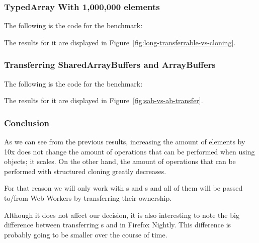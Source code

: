 \subsubsection{TypedArray With 1,000,000 elements}
The following is the code for the benchmark:

The results for it are displayed in Figure~\ref{fig:long-transferrable-vs-cloning}.

\subsubsection{Transferring SharedArrayBuffers and ArrayBuffers}
The following is the code for the benchmark:

The results for it are displayed in Figure~\ref{fig:sab-vs-ab-transfer}.

\subsubsection{Conclusion}
As we can see from the previous results, increasing the amount of elements by 10x does not change the amount of operations that can be performed when using  objects; it scales. On the other hand, the amount of operations that can be performed with structured cloning greatly decreases.

For that reason we will only work with \ttarray{}s and \tstarray{}s and all of them will be passed to/from Web Workers by transferring their ownership.

Although it does not affect our decision, it is also interesting to note the big difference between transferring \tsabuffer{}s and \tabuffer{} in Firefox Nightly. This difference is probably going to be smaller over the course of time.

\pagebreak
